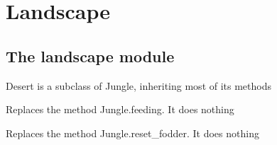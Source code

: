 \documentclass[a4paper,10pt,english]{sphinxmanual}
\begin{document}
\chapter{Landscape}
\label{\detokenize{landscape::doc}}\label{\detokenize{landscape:landscape}}

\section{The landscape module}
\label{\detokenize{landscape:the-landscape-module}}\label{\detokenize{landscape:module-biosim.landscape}}

\begin{fulllineitems}
\label{\detokenize{landscape:biosim.landscape.Desert}}
Desert is a subclass of Jungle, inheriting most of its methods

\begin{fulllineitems}
\label{\detokenize{landscape:biosim.landscape.Desert.feeding}}
Replaces the method Jungle.feeding. It does nothing

\end{fulllineitems}


\begin{fulllineitems}
\label{\detokenize{landscape:biosim.landscape.Desert.reset_fodder}}
Replaces the method Jungle.reset\_fodder. It does nothing

\end{fulllineitems}


\end{fulllineitems}

\end{document}
